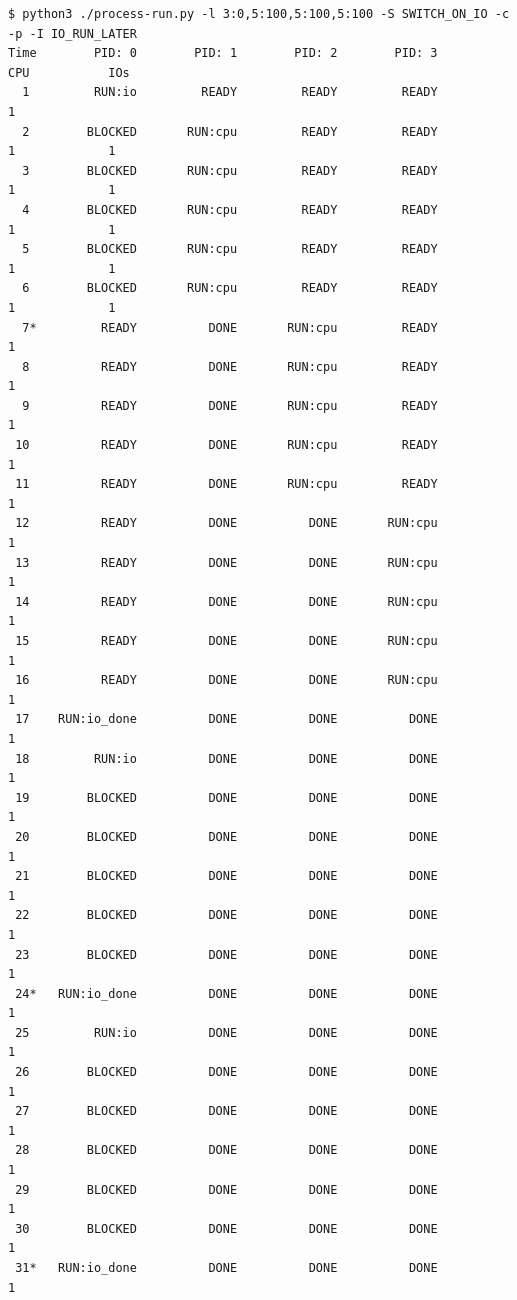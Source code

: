 \documentclass{article}
\begin{document}
\begin{enumerate}[label=\textbf{\arabic*}), start=3]
{    \begin{verbatim}
$ python3 ./process-run.py -l 3:0,5:100,5:100,5:100 -S SWITCH_ON_IO -c -p -I IO_RUN_LATER 
Time        PID: 0        PID: 1        PID: 2        PID: 3           CPU           IOs
  1         RUN:io         READY         READY         READY             1          
  2        BLOCKED       RUN:cpu         READY         READY             1             1
  3        BLOCKED       RUN:cpu         READY         READY             1             1
  4        BLOCKED       RUN:cpu         READY         READY             1             1
  5        BLOCKED       RUN:cpu         READY         READY             1             1
  6        BLOCKED       RUN:cpu         READY         READY             1             1
  7*         READY          DONE       RUN:cpu         READY             1          
  8          READY          DONE       RUN:cpu         READY             1          
  9          READY          DONE       RUN:cpu         READY             1          
 10          READY          DONE       RUN:cpu         READY             1          
 11          READY          DONE       RUN:cpu         READY             1          
 12          READY          DONE          DONE       RUN:cpu             1          
 13          READY          DONE          DONE       RUN:cpu             1          
 14          READY          DONE          DONE       RUN:cpu             1          
 15          READY          DONE          DONE       RUN:cpu             1          
 16          READY          DONE          DONE       RUN:cpu             1          
 17    RUN:io_done          DONE          DONE          DONE             1          
 18         RUN:io          DONE          DONE          DONE             1          
 19        BLOCKED          DONE          DONE          DONE                           1
 20        BLOCKED          DONE          DONE          DONE                           1
 21        BLOCKED          DONE          DONE          DONE                           1
 22        BLOCKED          DONE          DONE          DONE                           1
 23        BLOCKED          DONE          DONE          DONE                           1
 24*   RUN:io_done          DONE          DONE          DONE             1          
 25         RUN:io          DONE          DONE          DONE             1          
 26        BLOCKED          DONE          DONE          DONE                           1
 27        BLOCKED          DONE          DONE          DONE                           1
 28        BLOCKED          DONE          DONE          DONE                           1
 29        BLOCKED          DONE          DONE          DONE                           1
 30        BLOCKED          DONE          DONE          DONE                           1
 31*   RUN:io_done          DONE          DONE          DONE             1          


\end{verbatim}}
\end{enumerate}
\end{document}

